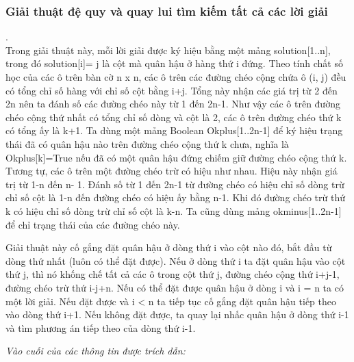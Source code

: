 \documentclass{hcmutarticle}
\begin{document}
\subsubsection{Giải thuật đệ quy và quay lui tìm kiếm tất cả các lời giải}.
\\
Trong giải thuật này, mỗi lời giải được ký hiệu bằng một mảng solution[1$..$n], trong đó solution[i]= j là cột mà quân hậu ở hàng thứ i đứng. Theo tính chất số học của các ô trên bàn cờ n x n, các ô trên các đường chéo cộng chứa ô (i, j) đều có tổng chỉ số hàng với chỉ số cột bằng i+j. Tổng này nhận các giá trị từ 2 đến 2n nên ta đánh số các đường chéo này từ 1 đến 2n-1. Như vậy các ô trên đường chéo cộng thứ nhất có tổng chỉ số dòng và cột là 2, các ô trên đường chéo thứ k có tổng ấy là k+1. Ta dùng một mảng Boolean Okplus[1..2n-1] để ký hiệu trạng thái đã có quân hậu nào trên đường chéo cộng thứ k chưa, nghĩa là Okplus[k]=True nếu đã có một quân hậu đứng chiếm giữ đường chéo cộng thứ k. Tương tự, các ô trên một đường chéo trừ có hiệu như nhau. Hiệu này nhận giá trị từ 1-n đến n- 1. Đánh số từ 1 đến 2n-1 từ đường chéo có hiệu chỉ số dòng trừ chỉ số cột là 1-n đến đường chéo có hiệu ấy bằng n-1. Khi đó đường chéo trừ thứ k có hiệu chỉ số dòng trừ chỉ số cột là k-n. Ta cũng dùng mảng okminus[1..2n-1] để chỉ trạng thái của các đường chéo này.

Giải thuật này cố gắng đặt quân hậu ở dòng thứ i vào cột nào đó, bắt đầu từ dòng thứ nhất (luôn có thể đặt được). Nếu ở dòng thứ i ta đặt quân hậu vào cột thứ j, thì nó khống chế tất cả các ô trong cột thứ j, đường chéo cộng thứ i+j-1, đường chéo trừ thứ i-j+n. Nếu có thể đặt được quân hậu ở dòng i và i = n ta có một lời giải. Nếu đặt được và i < n ta tiếp tục cố gắng đặt quân hậu tiếp theo vào dòng thứ i+1. Nếu không đặt được, ta quay lại nhấc quân hậu ở dòng thứ i-1 và tìm phương án tiếp theo của dòng thứ i-1.





























{\em Vào cuối của các thông tin được trích dẫn:}
\end{document}
